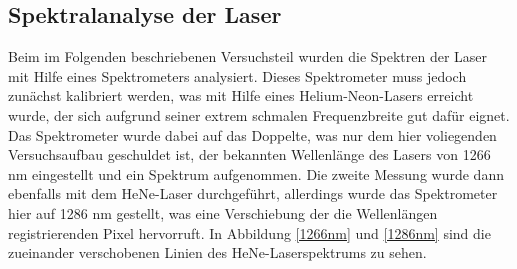 \subsection{Spektralanalyse der Laser}
Beim im Folgenden beschriebenen Versuchsteil wurden die Spektren der Laser mit Hilfe eines Spektrometers analysiert. Dieses Spektrometer muss jedoch zunächst kalibriert werden, was mit Hilfe eines Helium-Neon-Lasers erreicht wurde, der sich aufgrund seiner extrem schmalen Frequenzbreite gut dafür eignet. \newline
Das Spektrometer wurde dabei auf das Doppelte, was nur dem hier voliegenden Versuchsaufbau geschuldet ist, der bekannten Wellenlänge des Lasers von 1266 nm eingestellt und ein Spektrum aufgenommen. Die zweite Messung wurde dann ebenfalls mit dem HeNe-Laser durchgeführt, allerdings wurde das Spektrometer hier auf 1286 nm gestellt, was eine Verschiebung der die Wellenlängen registrierenden Pixel hervorruft. In Abbildung \ref{1266nm} und \ref{1286nm} sind die zueinander verschobenen Linien des HeNe-Laserspektrums zu sehen.
